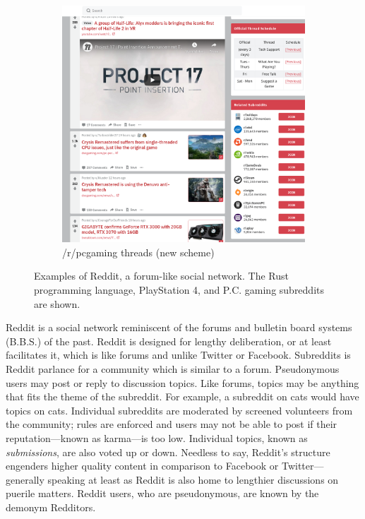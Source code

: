 \documentclass[12pt, a4paper]{article}
\begin{document}
\begin{figure}[ht!]
\begin{subfigure}[b]{0.4\linewidth}
    \includegraphics[width=\linewidth]{reddit_pcgaming.png}
    \caption{/r/pcgaming threads (new scheme)}
  \end{subfigure}
  \label{fig:redditexamples}
  \caption{Examples of Reddit, a forum-like social network. The Rust programming language, PlayStation 4, and P.C. gaming subreddits are shown.}
\end{figure}
Reddit is a social network reminiscent of the forums and bulletin board systems (B.B.S.) of the past. Reddit is designed for lengthy deliberation, or at least facilitates it, which is like forums and unlike Twitter or Facebook. Subreddits is Reddit parlance for a community which is similar to a forum. Pseudonymous users may post or reply to discussion topics. Like forums, topics may be anything that fits the theme of the subreddit. For example, a subreddit on cats would have topics on cats. Individual subreddits are moderated by screened volunteers from the community; rules are enforced and users may not be able to post if their reputation---known as karma---is too low. Individual topics, known as \textit{submissions}, are also voted up or down. Needless to say, Reddit's structure engenders higher quality content in comparison to Facebook or Twitter---generally speaking at least as Reddit is also home to lengthier discussions on puerile matters. Reddit users, who are pseudonymous, are known by the demonym Redditors.
\end{document}
